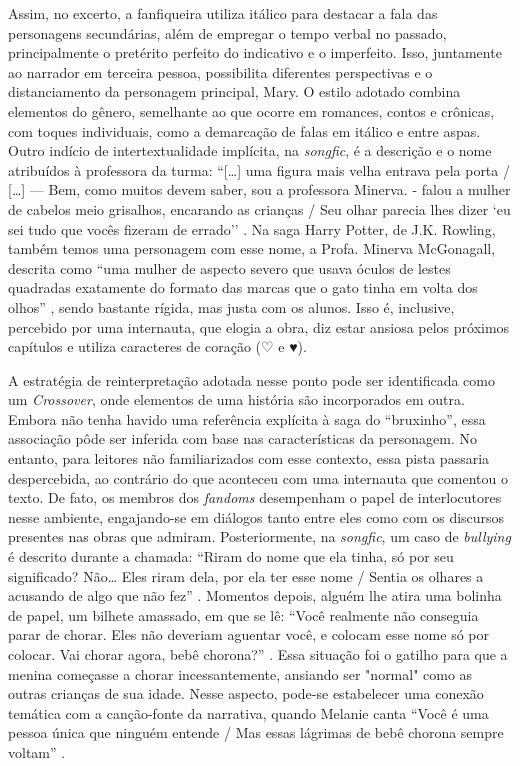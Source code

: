 Assim, no excerto, a fanfiqueira utiliza itálico para destacar a fala
das personagens secundárias, além de empregar o tempo verbal no passado,
principalmente o pretérito perfeito do indicativo e o imperfeito. Isso,
juntamente ao narrador em terceira pessoa, possibilita diferentes
perspectivas e o distanciamento da personagem principal, Mary. O estilo
adotado combina elementos do gênero, semelhante ao que ocorre em
romances, contos e crônicas, com toques individuais, como a demarcação
de falas em itálico e entre aspas. Outro indício de intertextualidade
implícita, na \emph{songfic}, é a descrição e o nome atribuídos à
professora da turma: ``{[}\ldots{]} uma figura mais velha entrava pela
porta / {[}\ldots{]} --- Bem, como muitos devem saber, sou a professora
Minerva. - falou a mulher de cabelos meio grisalhos, encarando as
crianças / Seu olhar parecia lhes dizer `eu sei tudo que vocês fizeram
de errado'' \cite{brookeyoongi}. Na saga Harry Potter, de J.K.
Rowling, também temos uma personagem com esse nome, a Profa. Minerva
McGonagall, descrita como ``uma mulher de aspecto severo que usava
óculos de lestes quadradas exatamente do formato das marcas que o gato
tinha em volta dos olhos'' \cite[p.13]{rowling2000}, sendo bastante
rígida, mas justa com os alunos. Isso é, inclusive, percebido por uma
internauta, que elogia a obra, diz estar ansiosa pelos próximos
capítulos e utiliza caracteres de coração 
({\Symbola ♡} e {\Symbola ♥}).

A estratégia de reinterpretação adotada nesse ponto pode ser
identificada como um \emph{Crossover}, onde elementos de uma história
são incorporados em outra. Embora não tenha havido uma referência
explícita à saga do ``bruxinho'', essa associação pôde ser inferida com
base nas características da personagem. No entanto, para leitores não
familiarizados com esse contexto, essa pista passaria despercebida, ao
contrário do que aconteceu com uma internauta que comentou o texto. De
fato, os membros dos \emph{fandoms} desempenham o papel de
interlocutores nesse ambiente, engajando-se em diálogos tanto entre eles
como com os discursos presentes nas obras que admiram. Posteriormente,
na \emph{songfic}, um caso de \emph{bullying} é descrito durante a
chamada: ``Riram do nome que ela tinha, só por seu significado?
Não\ldots{} Eles riram dela, por ela ter esse nome / Sentia os olhares a
acusando de algo que não fez'' \cite{brookeyoongi}. Momentos
depois, alguém lhe atira uma bolinha de papel, um bilhete amassado, em
que se lê: ``Você realmente não conseguia parar de chorar. Eles não
deveriam aguentar você, e colocam esse nome só por colocar. Vai chorar
agora, bebê chorona?'' \cite{brookeyoongi}. Essa situação foi o
gatilho para que a menina começasse a chorar incessantemente, ansiando
ser "normal" como as outras crianças de sua idade. Nesse aspecto,
pode-se estabelecer uma conexão temática com a canção-fonte da
narrativa, quando Melanie canta ``Você é uma pessoa única que ninguém
entende / Mas essas lágrimas de bebê chorona sempre voltam'' \cite{dollhouse2015}.


